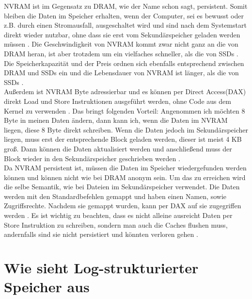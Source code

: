 \documentclass{class/thesis}
\begin{document}
\begin{thesis}
	NVRAM ist im Gegensatz zu DRAM, wie der Name schon sagt, persistent. Somit bleiben die Daten im Speicher erhalten, wenn der Computer, sei es bewusst oder z.B. durch einen Stromausfall, ausgeschaltet wird und sind  nach dem Systemstart direkt wieder nutzbar, ohne dass sie erst vom Sekundärspeicher geladen werden müssen \cite{Scargall:2020:PPM}.
	Die Geschwindigkeit von NVRAM kommt zwar nicht ganz an die von DRAM heran, ist aber trotzdem um ein vielfaches schneller, als die von SSDs \cite{PMEM.IO}.
	Die Speicherkapazität und der Preis ordnen sich ebenfalls entsprechend zwischen DRAM und SSDs ein \cite{PMEM.IO} und die Lebensdauer von NVRAM ist länger, als die von SSDs \cite{Scargall:2020:PPM}. \\
	Außerdem ist NVRAM Byte adressierbar und es können per \glqq{}Direct Access\grqq{}(DAX) direkt Load und Store Instruktionen ausgeführt werden, ohne Code aus dem Kernel zu verwenden \cite{Rudoff:2017:PMP}. 
	Das bringt folgenden Vorteil: Angenommen ich möchten 8 Byte in meinen Daten ändern, dann kann ich, wenn die Daten im NVRAM liegen, diese 8 Byte direkt schreiben. Wenn die Daten jedoch im Sekundärspeicher liegen, muss erst der entsprechende Block geladen werden, dieser ist meist 4 KB groß. Dann können die Daten aktualisiert werden und anschließend muss der Block wieder in den Sekundärspeicher geschrieben werden \cite{Scargall:2020:PPM}. \\
	Da NVRAM persistent ist, müssen die Daten im Speicher wiedergefunden werden können und können nicht wie bei DRAM anonym sein. Um das zu erreichen wird die selbe Semantik, wie bei Dateien im Sekundärspeicher verwendet. Die Daten werden mit den Standardbefehlen gemappt und haben einen Namen, sowie Zugriffsrechte. Nachdem sie gemappt wurden, kann per DAX auf sie zugegriffen werden \cite{Rudoff:2017:PMP}. Es ist wichtig zu beachten, dass es nicht alleine ausreicht Daten per Store Instruktion zu schreiben, sondern man auch die Caches flushen muss, andernfalls sind sie nicht persistiert und könnten verloren gehen \cite{Rudoff:2017:PMP}.
	
	
	
	\section{Wie sieht Log-strukturierter Speicher aus}
	

\end{thesis}
\end{document}

